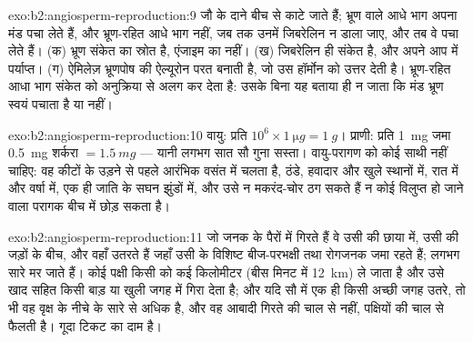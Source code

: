 \begin{solution}{exo:b2:angiosperm-reproduction:9}
जौ के दाने बीच से काटे जाते हैं; भ्रूण वाले आधे भाग अपना मंड पचा लेते
हैं, और भ्रूण-रहित आधे भाग नहीं, जब तक उनमें जिबरेलिन न डाला जाए, और तब
वे पचा लेते हैं। (क) भ्रूण संकेत का स्रोत है, एंजाइम का नहीं।
(ख) जिबरेलिन ही संकेत है, और अपने आप में पर्याप्त।
(ग) ऐमिलेज़ भ्रूणपोष की ऐल्यूरोन परत बनाती है,
जो उस हॉर्मोन को उत्तर देती है। भ्रूण-रहित आधा भाग संकेत को
अनुक्रिया से अलग कर देता है: उसके बिना यह बताया ही न जाता कि मंड भ्रूण
स्वयं पचाता है या नहीं।
\end{solution}

\begin{solution}{exo:b2:angiosperm-reproduction:10}
वायु: प्रति  $10^{6}\times\qty{1}{\micro g} = \qty{1}{g}$। प्राणी:
प्रति  \qty{1}{mg}  जमा \qty{0.5}{mg} शर्करा $= \qty{1.5}{mg}$
--- यानी लगभग सात सौ गुना सस्ता। वायु-परागण
को कोई साथी नहीं चाहिए: वह कीटों के उड़ने से पहले आरंभिक वसंत में चलता
है, ठंडे, हवादार और खुले स्थानों में, रात में और वर्षा में, एक ही जाति
के सघन झुंडों में, और उसे न मकरंद-चोर ठग सकते हैं न कोई
विलुप्त हो जाने वाला परागक बीच में छोड़ सकता है।
\end{solution}

\begin{solution}{exo:b2:angiosperm-reproduction:11}
जो  जनक के पैरों में गिरते हैं वे उसी की छाया में, उसी की जड़ों के
बीच, और वहाँ उतरते हैं जहाँ उसी के विशिष्ट बीज-परभक्षी तथा रोगजनक जमा
रहते हैं; लगभग सारे मर जाते हैं। कोई पक्षी किसी  को कई किलोमीटर
(बीस मिनट में \qty{12}{km}) ले जाता है और उसे खाद सहित किसी
बाड़ या खुली जगह में गिरा देता है; और यदि सौ में एक  ही किसी अच्छी
जगह उतरे, तो भी वह वृक्ष के नीचे के सारे  से अधिक है, और वह
आबादी गिरते  की चाल से नहीं, पक्षियों की चाल से फैलती है। गूदा
टिकट का दाम है।
\end{solution}

